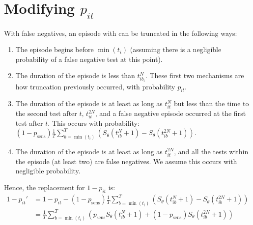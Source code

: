 \documentclass[main.tex]{subfiles}
\begin{document}
\section{Modifying $p_{it}$} \label{modifying-p_it}

With false negatives, an episode with can be truncated in the following
ways:

\begin{enumerate}
\item
  The episode begins before $\min(t_i)$ (assuming there is a
  negligible probability of a false negative test at this point).
\item
  The duration of the episode is less than $t_{ib_i}^N$. These first
  two mechanisms are how truncation previously occurred, with
  probability $p_{it}$.
\item
  The duration of the episode is at least as long as $t_{it}^N$ but
  less than the time to the second test after $t$, $t_{it}^{2N}$,
  and a false negative episode occurred at the first test after $t$.
  This occurs with probability:
  \begin{math}
    (1 - p_\text{sens})\frac{1}{T} \sum_{b=\min(t_i)}^T \left( S_\theta(t_{ib}^N + 1) - S_\theta(t_{ib}^{2N} + 1)\right).
  \end{math}
\item
  The duration of the episode is at least as long as $t_{it}^{2N}$,
  and all the tests within the episode (at least two) are false
  negatives. We assume this occurs with negligible probability.
\end{enumerate}

Hence, the replacement for $1 - p_{it}$ is:
\begin{align}
1 - p_{it}'
&= 1 - p_{it} - (1 - p_\text{sens})\frac{1}{T} \sum_{b=\min(t_i)}^T \left( S_\theta(t_{ib}^N + 1) - S_\theta(t_{ib}^{2N} + 1)\right) \\
&= \frac{1}{T} \sum_{b=\min(t_i)}^T \left( p_\text{sens} S_\theta(t_{ib}^N + 1) + (1 - p_\text{sens}) S_\theta(t_{ib}^{2N} + 1)\right) \\
\end{align}
\end{document}
